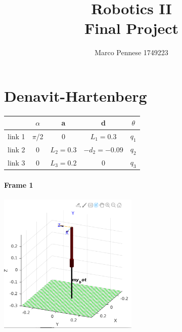 \documentclass{article}
\title{\textbf{Robotics II} \\ \large{\textbf{Final Project}}}
\author{Marco Pennese 1749223}
\date{}
\begin{document}
\maketitle
\tableofcontents
\pagebreak
\section{Denavit-Hartenberg}
\paragraph{}
\FloatBarrier
\begin{table}[!htbp]
\centering
\begin{tabular}{|c|cccc|}
\hline
& $\alpha$ & a & d & $\theta$\\
\hline
link 1 & $\pi$/2 & 0 & $L_1=0.3$ & $q_1$\\
link 2 & 0 & $L_2=0.3$ & $-d_2=-0.09$ & $q_2$\\
link 3 & 0 & $L_3=0.2$ & 0 & $q_3$\\
\hline
\end{tabular}
\end{table}
\paragraph{Frame 1}
\begin{center}
\includegraphics[width=0.5\textwidth]{images/frame1.png}
\end{center}
\end{document}
